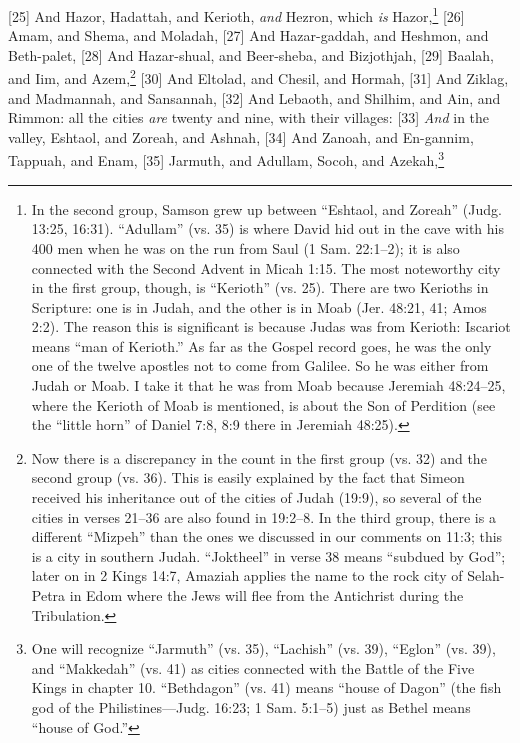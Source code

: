 [25] \textcolor[rgb]{0.00,0.00,1.00}{And Hazor, Hadattah, and Kerioth, \emph{and} Hezron, which \emph{is} Hazor,}\footnote{In the second group, Samson grew up between “Eshtaol, and Zoreah” (Judg. 13:25,
16:31). “Adullam” (vs. 35) is where David hid out in the cave with his 400 men when he was
on the run from Saul (1 Sam. 22:1–2); it is also
connected with the Second Advent in Micah
1:15. The most noteworthy city in the first group,
though, is “Kerioth” (vs. 25). There are two
Kerioths in Scripture: one is in Judah, and the
other is in Moab (Jer. 48:21, 41; Amos 2:2).
The reason this is significant is because Judas
was from Kerioth: Iscariot means ``man of Kerioth.'' As far as the Gospel record goes, he was the only one of the twelve apostles not to come from Galilee. So he was either from Judah or Moab. I take it that he was from Moab because Jeremiah 48:24--25, where the Kerioth of Moab is mentioned, is about the Son of Perdition (see the ``little horn'' of Daniel 7:8, 8:9
there in Jeremiah 48:25).}
[26] \textcolor[rgb]{0.00,0.00,1.00}{Amam, and Shema, and Moladah,}
[27] \textcolor[rgb]{0.00,0.00,1.00}{And Hazar-gaddah, and Heshmon, and Beth-palet,}
[28] \textcolor[rgb]{0.00,0.00,1.00}{And Hazar-shual, and Beer-sheba, and Bizjothjah,}
[29] \textcolor[rgb]{0.00,0.00,1.00}{Baalah, and Iim, and Azem,}\footnote{Now there is a discrepancy in the count in
the first group (vs. 32) and the second group
(vs. 36). This is easily explained by the fact that
Simeon received his inheritance out of the cities
of Judah (19:9), so several of the cities in verses
21–36 are also found in 19:2–8.
In the third group, there is a different
“Mizpeh” than the ones we discussed in our
comments on 11:3; this is a city in southern
Judah. “Joktheel” in verse 38 means “subdued
by God”; later on in 2 Kings 14:7, Amaziah
applies the name to the rock city of Selah-Petra
in Edom where the Jews will flee from the
Antichrist during the Tribulation.}
[30] \textcolor[rgb]{0.00,0.00,1.00}{And Eltolad, and Chesil, and Hormah,}
[31] \textcolor[rgb]{0.00,0.00,1.00}{And Ziklag, and Madmannah, and Sansannah,}
[32] \textcolor[rgb]{0.00,0.00,1.00}{And Lebaoth, and Shilhim, and Ain, and Rimmon: all the cities \emph{are} twenty and nine, with their villages:}
[33] \textcolor[rgb]{0.00,0.00,1.00}{\emph{And} in the valley, Eshtaol, and Zoreah, and Ashnah,}
[34] \textcolor[rgb]{0.00,0.00,1.00}{And Zanoah, and En-gannim, Tappuah, and Enam,}
[35] \textcolor[rgb]{0.00,0.00,1.00}{Jarmuth, and Adullam, Socoh, and Azekah,}\footnote{One will recognize “Jarmuth” (vs. 35),
“Lachish” (vs. 39), “Eglon” (vs. 39), and
“Makkedah” (vs. 41) as cities connected with
the Battle of the Five Kings in chapter 10.
“Bethdagon” (vs. 41) means “house of
Dagon” (the fish god of the Philistines—Judg.
16:23; 1 Sam. 5:1–5) just as Bethel means
“house of God.”}
